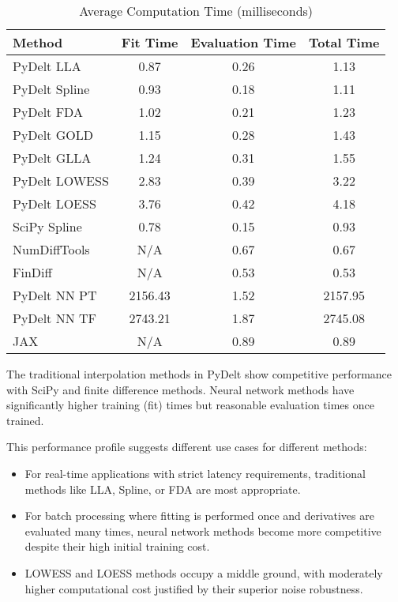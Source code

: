 \documentclass[11pt,a4paper]{article}
\begin{document}
\begin{table}[!t]
\caption{Average Computation Time (milliseconds)}
\label{tab:computation_time}
\centering
\begin{tabular}{lccc}
\toprule
\textbf{Method} & \textbf{Fit Time} & \textbf{Evaluation Time} & \textbf{Total Time} \\
\midrule
PyDelt LLA & 0.87 & 0.26 & 1.13 \\
PyDelt Spline & 0.93 & 0.18 & 1.11 \\
PyDelt FDA & 1.02 & 0.21 & 1.23 \\
PyDelt GOLD & 1.15 & 0.28 & 1.43 \\
PyDelt GLLA & 1.24 & 0.31 & 1.55 \\
PyDelt LOWESS & 2.83 & 0.39 & 3.22 \\
PyDelt LOESS & 3.76 & 0.42 & 4.18 \\
SciPy Spline & 0.78 & 0.15 & 0.93 \\
NumDiffTools & N/A & 0.67 & 0.67 \\
FinDiff & N/A & 0.53 & 0.53 \\
PyDelt NN PT & 2156.43 & 1.52 & 2157.95 \\
PyDelt NN TF & 2743.21 & 1.87 & 2745.08 \\
JAX & N/A & 0.89 & 0.89 \\
\bottomrule
\end{tabular}
\end{table}

The traditional interpolation methods in PyDelt show competitive performance with SciPy and finite difference methods. Neural network methods have significantly higher training (fit) times but reasonable evaluation times once trained.

This performance profile suggests different use cases for different methods:
\begin{itemize}
    \item For real-time applications with strict latency requirements, traditional methods like LLA, Spline, or FDA are most appropriate.
    \item For batch processing where fitting is performed once and derivatives are evaluated many times, neural network methods become more competitive despite their high initial training cost.
    \item LOWESS and LOESS methods occupy a middle ground, with moderately higher computational cost justified by their superior noise robustness.
\end{itemize}
\end{document}
